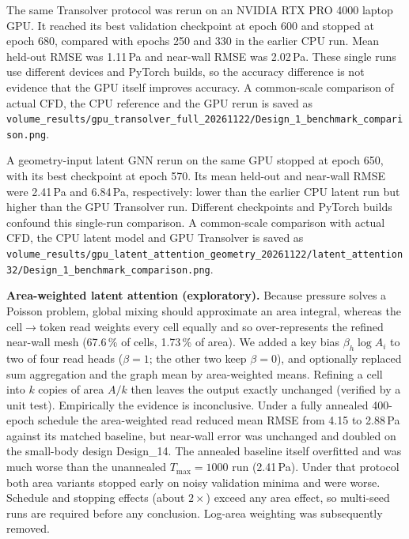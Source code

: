\documentclass[journal]{IEEEtran}
\begin{document}
The same Transolver protocol was rerun on an NVIDIA RTX PRO 4000 laptop GPU.
It reached its best validation checkpoint at epoch 600 and stopped at epoch 680,
compared with epochs 250 and 330 in the earlier CPU run. Mean held-out RMSE
was 1.11\,Pa and near-wall RMSE was 2.02\,Pa. These single runs use different
devices and PyTorch builds, so the accuracy difference is not evidence that the
GPU itself improves accuracy. A common-scale comparison of actual CFD, the CPU
reference and the GPU rerun is saved as
\texttt{volume\_results/gpu\_transolver\_full\_20261122/Design\_1\_benchmark\_comparison.png}.

A geometry-input latent GNN rerun on the same GPU stopped at epoch 650, with
its best checkpoint at epoch 570. Its mean held-out and near-wall RMSE were
2.41\,Pa and 6.84\,Pa, respectively: lower than the earlier CPU latent run but
higher than the GPU Transolver run. Different checkpoints and PyTorch builds
confound this single-run comparison. A common-scale comparison with actual CFD,
the CPU latent model and GPU Transolver is saved as
\texttt{volume\_results/gpu\_latent\_attention\_geometry\_20261122/latent\_attention32/Design\_1\_benchmark\_comparison.png}.

\textbf{Area-weighted latent attention (exploratory).} Because pressure solves
a Poisson problem, global mixing should approximate an area integral, whereas
the cell$\to$token read weights every cell equally and so over-represents the
refined near-wall mesh (67.6\,\% of cells, 1.73\,\% of area). We added a key
bias $\beta_h\log A_i$ to two of four read heads ($\beta{=}1$; the other two
keep $\beta{=}0$), and optionally replaced sum aggregation and the graph mean by
area-weighted means. Refining a cell into $k$ copies of area $A/k$ then leaves
the output exactly unchanged (verified by a unit test). Empirically the evidence
is inconclusive. Under a fully annealed 400-epoch schedule the area-weighted read
reduced mean RMSE from 4.15 to 2.88\,Pa against its matched baseline, but
near-wall error was unchanged and doubled on the small-body design Design\_14.
The annealed baseline itself overfitted and was much worse than the unannealed
$T_\mathrm{max}{=}1000$ run (2.41\,Pa). Under that protocol both area variants
stopped early on noisy validation minima and were worse. Schedule and stopping
effects (about $2\times$) exceed any area effect, so multi-seed runs are required
before any conclusion. Log-area weighting was subsequently removed.
\end{document}
